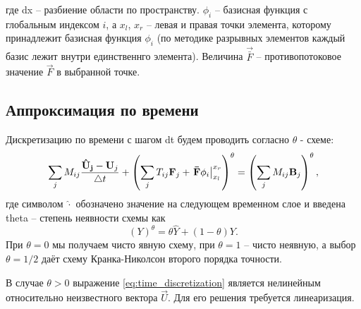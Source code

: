 где \gls{dx} -- разбиение области по пространству.
$\phi_i$ -- базисная функция с глобальным индексом $i$,
а $x_l$, $x_r$ -- левая и правая точки элемента, которому принадлежит базисная функция $\phi_i$
(по методике разрывных элементов каждый базис лежит внутри единственнго элемента).
Величина $\vec{\bar F}$ -- противопотоковое значение $\vec F$ в выбранной точке.

\subsection{Аппроксимация по времени}

Дискретизацию по времени с шагом \gls{dt} будем проводить согласно $\theta$ - схеме:
\begin{equation}
\label{eq:time_discretization}
\sum\limits_j M_{ij} \frac{\boldsymbol{\rm \hat U_j} - \boldsymbol{\rm U}_j}{\triangle t}
+ \left( \sum\limits_j T_{ij} \boldsymbol{\rm F}_j + \left.\boldsymbol{\rm \bar F} \phi_i \right|_{x_l}^{x_r} \right)^\theta
= 
\left(\sum\limits_j M_{ij} \boldsymbol{\rm B}_j\right)^\theta,
\end{equation}
где символом $\hat \cdot$ обозначено значение на следующем временном слое и введена \gls{theta} -- степень неявности схемы как
\begin{equation*}
\left(Y\right)^\theta = \theta \hat Y + (1 - \theta) Y.
\end{equation*}
При $\theta=0$ мы получаем чисто явную схему, при $\theta = 1$ -- чисто неявную, а выбор $\theta = 1/2$ 
даёт схему Кранка-Николсон второго порядка точности.

В случае $\theta > 0$ выражение \cref{eq:time_discretization} 
является нелинейным относительно неизвестного вектора $\vec U$.
Для его решения требуется линеаризация.

